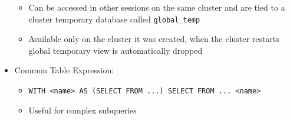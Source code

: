 \documentclass[11pt]{scrartcl}
\begin{document}
\begin{itemize}
\begin{itemize}
		\item Can be accessed in other sessions on the same cluster and are tied to a cluster temporary database called \texttt{global\_temp}
		\item Available only on the cluster it was created, when the cluster restarts global temporary view is automatically dropped
	\end{itemize}
	\item Common Table Expression:
	\begin{itemize}
		\item \texttt{WITH <name> AS (SELECT FROM ...) SELECT FROM ... <name>}
		\item Useful for complex subqueries
	\end{itemize} 
\end{itemize}
\end{document}
